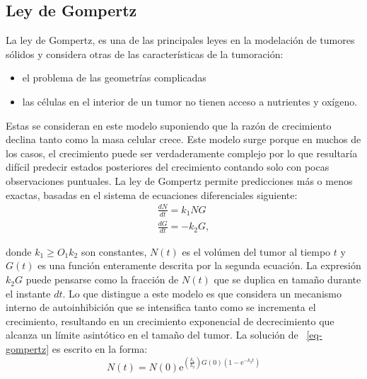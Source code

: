 \subsection{Ley de Gompertz}
La ley de Gompertz, es una de las principales leyes en la modelación de tumores sólidos y considera otras de las características de la tumoración:
\begin{itemize}
    \item el problema de las geometrías complicadas
    \item las células en el interior de un tumor no tienen acceso a nutrientes y oxígeno.
\end{itemize}

Estas se consideran en este modelo suponiendo que la razón de crecimiento declina tanto como la masa celular crece. Este modelo surge porque en muchos de los casos, el crecimiento puede ser verdaderamente complejo por lo que resultaría difícil predecir estados posteriores del crecimiento contando solo con pocas observaciones puntuales. La ley de Gompertz permite predicciones más o menos exactas, basadas en el sistema de ecuaciones diferenciales siguiente:
\begin{equation}
    \begin{split}
        \frac{dN}{dt} = k_{1}NG\\
        \frac{dG}{dt} = -k_{2}G,\label{eq-gompertz}
    \end{split}
\end{equation}

donde $k_{1} \geq O_{1}k_{2}$ son constantes, $N(t)$ es el vol\'umen del tumor al tiempo $t$ y $G(t)$ es una funci\'on enteramente descrita por la segunda ecuaci\'on. La expresión $k_{2}G$ puede pensarse como la fracción de $N(t)$ que se duplica en tamaño durante el instante $dt$. Lo que distingue a este modelo es que considera un mecanismo interno de autoinhibición que se intensifica tanto como se incrementa el crecimiento, resultando en un crecimiento exponencial de decrecimiento que alcanza un límite asintótico en el tamaño del tumor. La solución de ~\ref{eq-gompertz} es escrito en la forma:
\begin{equation}
    N(t) = N(0) \mathrm{e}^{(\frac{k_{1}}{k_{2}})G(0)(1 - \mathrm{e}^{-k_{2}t})}
\end{equation}


